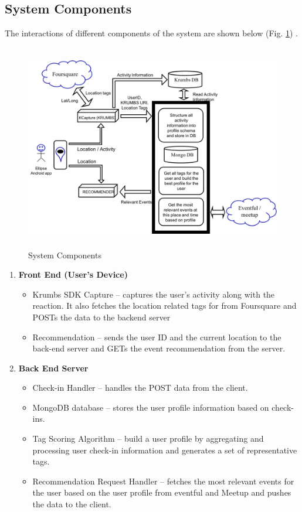 \documentclass[12pt,letterpaper]{article}
\begin{document}
\subsection{System Components}
The interactions of different components of the system are shown below (Fig. \ref{fig:syscomp}) .
\begin{figure}[H]
	\centering
	 \includegraphics[width=\textwidth, height=9cm]{img/syscomp.png}
	 \caption{System Components}
 	 \label{fig:syscomp}
\end{figure}
\begin{enumerate}

\item \textbf{Front End (User’s Device)}
	\begin{itemize}
	\item Krumbs SDK Capture -- captures the user's activity along with the reaction. It also fetches the location related tags for from Foursquare and POSTs the data to the backend server
	\item Recommendation -- sends the user ID and the current location to the back-end server and GETs the event recommendation from the server.
	\end{itemize}
\item \textbf{Back End Server}
	\begin{itemize}
	\item Check-in Handler -- handles the POST data from the client.
	\item MongoDB database -- stores the user profile information based on check-ins.
	\item Tag Scoring Algorithm -- build a user profile by aggregating and processing user check-in information and generates a set of representative tags.
	\item Recommendation Request Handler -- fetches the most relevant events for the user based on the user profile from eventful and Meetup and pushes the data to the client. 
	\end{itemize}
\end{enumerate}
\end{document}
